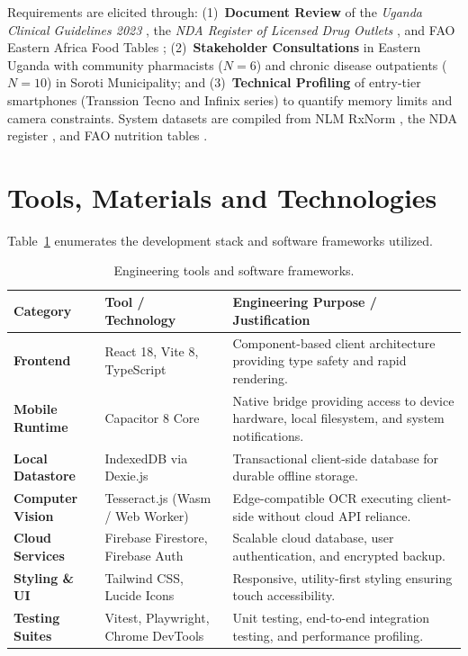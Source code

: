 Requirements are elicited through: (1)~\textbf{Document Review} of the \textit{Uganda Clinical Guidelines 2023} \cite{moh2023guidelines}, the \textit{NDA Register of Licensed Drug Outlets} \cite{nda2024register}, and FAO Eastern Africa Food Tables \cite{fao2019food}; (2)~\textbf{Stakeholder Consultations} in Eastern Uganda with community pharmacists ($N=6$) and chronic disease outpatients ($N=10$) in Soroti Municipality; and (3)~\textbf{Technical Profiling} of entry-tier smartphones (Transsion Tecno and Infinix series) to quantify memory limits and camera constraints. System datasets are compiled from NLM RxNorm \cite{rxnorm2024}, the NDA register \cite{nda2024register}, and FAO nutrition tables \cite{fao2019food}.

\section{Tools, Materials and Technologies}

Table~\ref{tab:tools_technologies} enumerates the development stack and software frameworks utilized.

\begin{table}[!htbp]
  \centering
  \caption{Engineering tools and software frameworks.}
  \label{tab:tools_technologies}
  \footnotesize
  \setlength{\tabcolsep}{3.5pt}
  \begin{tabularx}{\textwidth}{@{} >{\raggedright\arraybackslash}p{2.6cm} >{\raggedright\arraybackslash}p{3.8cm} >{\raggedright\arraybackslash}X @{}}
    \toprule
    \textbf{Category} & \textbf{Tool / Technology} & \textbf{Engineering Purpose / Justification} \\
    \midrule
    \textbf{Frontend} & React 18, Vite 8, TypeScript & Component-based client architecture providing type safety and rapid rendering. \\
    \textbf{Mobile Runtime} & Capacitor 8 Core & Native bridge providing access to device hardware, local filesystem, and system notifications. \\
    \textbf{Local Datastore} & IndexedDB via Dexie.js & Transactional client-side database for durable offline storage. \\
    \textbf{Computer Vision} & Tesseract.js (Wasm / Web Worker) & Edge-compatible OCR executing client-side without cloud API reliance. \\
    \textbf{Cloud Services} & Firebase Firestore, Firebase Auth & Scalable cloud database, user authentication, and encrypted backup. \\
    \textbf{Styling \& UI} & Tailwind CSS, Lucide Icons & Responsive, utility-first styling ensuring touch accessibility. \\
    \textbf{Testing Suites} & Vitest, Playwright, Chrome DevTools & Unit testing, end-to-end integration testing, and performance profiling. \\
    \bottomrule
  \end{tabularx}
\end{table}

